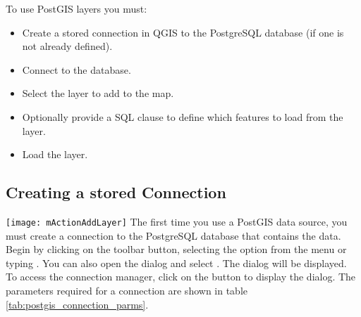 To use PostGIS layers you must:

\begin{itemize}[label=--]
\item Create a stored connection in QGIS to the PostgreSQL database (if one is
not already defined).
\item Connect to the database.
\item Select the layer to add to the map.
\item Optionally provide a SQL 
clause to define which features
to load from the layer.
\item Load the layer.
\end{itemize}

\subsection{Creating a stored
Connection}\label{sec:postgis_stored}

\texttt{[image: mActionAddLayer]} The first time
you use a PostGIS data source, you must create a connection to the PostgreSQL
database that contains the data. Begin by clicking on the
 toolbar button, selecting the
 option from the
 menu or typing . You can also
open the  dialog and select .
The  dialog will
be displayed. To access the connection manager, click on the  button to display the  dialog. The parameters required for a connection are shown
in table \ref{tab:postgis_connection_parms}.

